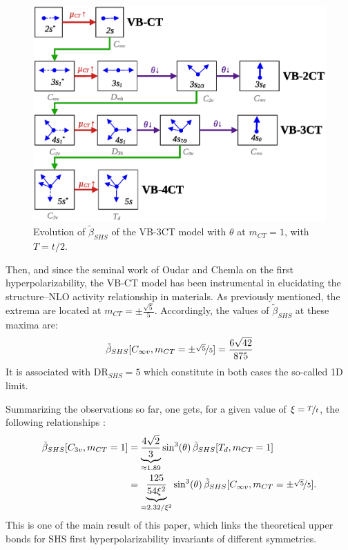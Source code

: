 \documentclass[journal=jpcafh]{achemso}
\begin{document}
\begin{figure}[!h]
\includegraphics[width=.6\linewidth]{Figure6}
\caption{Evolution of $\tilde\beta_{SHS}$ of  the VB-3CT model with $\theta$ at $m_{CT}= 1$, with $T=t/2$.}
\label{fig:theta}
\end{figure}

Then, and since the seminal work of Oudar and Chemla\cite{oudarHyperpolarizabilitiesNitroanilinesTheir1977} on the first hyperpolarizability, the VB-CT model has been instrumental in elucidating the structure–NLO activity relationship in materials\cite{luValenceBondChargeTransferModel1994,barzoukasTwostateDescriptionHyper1996,barzoukasTWOFORMDESCRIPTIONPUSHPULL1996,blanchard-desceTwoformTwostateAnalysis1998a}. As previously mentioned, the extrema are located at $m_{CT} = \pm\frac{\sqrt{5}}{5}$. Accordingly, the values of $\tilde\beta_{SHS}$ at these maxima are:
\begin{align}
	\tilde\beta_{SHS}[C_{\infty v}, m_{CT}=\pm\nicefrac{\sqrt{5}}{5}] = \frac{6\sqrt{42}}{875} \label{eq:2stmax}
\end{align}
It is associated with DR$_{SHS}=5$ which constitute in both cases the so-called 1D limit.

Summarizing the observations so far, one gets, for a given value of $\xi=\nicefrac{T}{t}$, the following relationships :
\begin{align}
	\tilde\beta_{SHS}[C_{3v}, m_{CT}=1]  &= \underbrace{\frac{4\sqrt{2}}{3}}_{\approx 1.89}\sin^3(\theta)\,\tilde\beta_{SHS}[T_d, m_{CT}=1]\nonumber \\
	&=  \underbrace{\frac{125}{54 \xi^2}}_{\approx 2.32 / \xi^2}\sin^3(\theta)\,\tilde\beta_{SHS}[C_{\infty v}, m_{CT}=\pm\nicefrac{\sqrt{5}}{5}].
\end{align}
This is one of the main result of this paper, which links the theoretical upper bonds for SHS first hyperpolarizability invariants of different symmetries.
\end{document}
